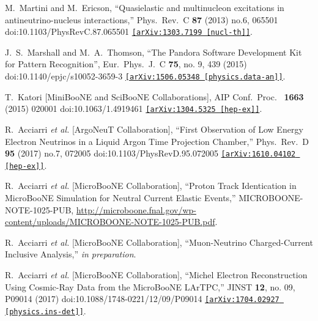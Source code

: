 \documentclass[a4paper]{article}
\begin{document}
\begin{thebibliography}{99}
  M.~Martini and M.~Ericson,
  ``Quasielastic and multinucleon excitations in antineutrino-nucleus interactions,''
  Phys.\ Rev.\ C \textbf{87} (2013) no.6,  065501
  doi:10.1103/PhysRevC.87.065501
  \href{https://arxiv.org/abs/1303.7199}{\texttt{[arXiv:1303.7199 [nucl-th]]}}.
  
   J.~S.~Marshall and M.~A.~Thomson, 
  ``The Pandora Software Development Kit for Pattern Recognition'', Eur.\ Phys.\ J.\ C \textbf{75}, no. 9, 439 (2015) doi:10.1140/epjc/s10052-3659-3 \href{https://arxiv.org/abs/1506.05348}{\texttt{[arXiv:1506.05348 [physics.data-an]]}}.
  

  T.~Katori [MiniBooNE and SciBooNE Collaborations],
  AIP Conf.\ Proc.\  \textbf{ 1663} (2015) 020001
  doi:10.1063/1.4919461
  \href{https://arxiv.org/abs/1304.5325}{\texttt{[arXiv:1304.5325 [hep-ex]]}}.
  
  R.~Acciarri \emph{et al.} [ArgoNeuT Collaboration],
  ``First Observation of Low Energy Electron Neutrinos in a Liquid Argon Time Projection Chamber,''
  Phys.\ Rev.\ D \textbf{ 95} (2017) no.7,  072005
  doi:10.1103/PhysRevD.95.072005
  \href{https://arxiv.org/abs/1610.04102}{\texttt{[arXiv:1610.04102 [hep-ex]]}}.
  
  R.~Acciarri \emph{et al.} [MicroBooNE Collaboration],
  ``Proton Track Identication in MicroBooNE Simulation for Neutral Current Elastic Events,'' MICROBOONE-NOTE-1025-PUB,
  \url{http://microboone.fnal.gov/wp-content/uploads/MICROBOONE-NOTE-1025-PUB.pdf}.

  R.~Acciarri \emph{et al.} [MicroBooNE Collaboration],
  ``Muon-Neutrino Charged-Current Inclusive Analysis,'' \emph{in preparation}.

  R.~Acciarri {\it et al.} [MicroBooNE Collaboration],
  ``Michel Electron Reconstruction Using Cosmic-Ray Data from the MicroBooNE LArTPC,''
  JINST {\bf 12}, no. 09, P09014 (2017)
  doi:10.1088/1748-0221/12/09/P09014
  \href{https://arxiv.org/abs/1704.02927}{\texttt{[arXiv:1704.02927 [physics.ins-det]]}}.


\end{thebibliography}
\end{document}

